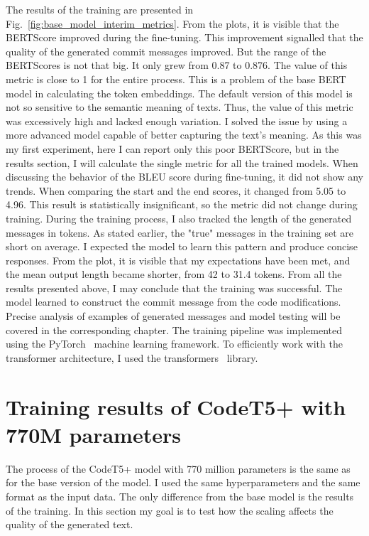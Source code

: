 The results of the training are presented in Fig.~\ref{fig:base_model_interim_metrics}.  From the plots, it is visible that the BERTScore improved during the fine-tuning. This improvement signalled that the quality of the generated commit messages improved. But the range of the BERTScores is not that big. It only grew from 0.87 to 0.876. The value of this metric is close to 1 for the entire process. This is a problem of the base BERT model in calculating the token embeddings. The default version of this model is not so sensitive to the semantic meaning of texts. Thus, the value of this metric was excessively high and lacked enough variation. I solved the issue by using a more advanced model capable of better capturing the text's meaning. As this was my first experiment, here I can report only this poor BERTScore, but in the results section, I will calculate the single metric for all the trained models. 
When discussing the behavior of the BLEU score during fine-tuning, it did not show any trends. When comparing the start and the end scores, it changed from 5.05 to 4.96. This result is statistically insignificant, so the metric did not change during training.
During the training process, I also tracked the length of the generated messages in tokens. As stated earlier, the "true" messages in the training set are short on average. I expected the model to learn this pattern and produce concise responses. From the plot, it is visible that my expectations have been met, and the mean output length became shorter, from 42 to 31.4 tokens.
From all the results presented above, I may conclude that the training was successful. The model learned to construct the commit message from the code modifications. Precise analysis of examples of generated messages and model testing will be covered in the corresponding chapter. The training pipeline was implemented using the PyTorch~\cite{paszke2019pytorch} machine learning framework. To efficiently work with the transformer architecture, I used the transformers~\cite{wolf2019huggingface} library.

\section{Training results of CodeT5+ with 770M \newline parameters}
The process of the CodeT5+  model with 770 million parameters is the same as for the base version of the model. I used the same hyperparameters and the same format as the input data. The only difference from the base model is the results of the training. In this section my goal is to test how the scaling affects the quality of the generated text. 

